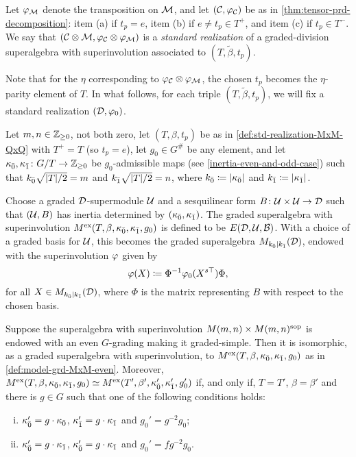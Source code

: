\begin{defi}
    Let $\varphi_{\mathcal M}$ denote the transposition on $\mathcal M$, and let $(\mathcal C, \varphi_{\mathcal C})$ be as in \cref{thm:tensor-prd-decomposition}: item (a) if $t_p =e$, item (b) if $e \neq t_p \in T^+$, and item (c) if $t_p \in T^-$.
    We say that $(\mathcal C \otimes \mathcal M, \varphi_{\mathcal C} \otimes \varphi_{\mathcal M})$ is a \emph{standard realization} of a graded-division superalgebra with superinvolution associated to $(T, \tilde\beta, t_p)$. 
\end{defi}

Note that for the $\eta$ corresponding to $ \varphi_{\mathcal C} \otimes \varphi_{\mathcal M}$, the chosen $t_p$ becomes the $\eta$-parity element of $T$. 
In what follows, for each triple $(T, \tilde\beta, t_p)$, we will fix a standard realization $(\mathcal{D}, \varphi_0)$. 


\begin{defi}\label{def:model-grd-MxM-even}
    Let $m, n\in \mathbb{Z}_{\geq 0}$, not both zero, 
    let $(T, \beta, t_p)$ be as in \cref{def:std-realization-MxM-QxQ} with $T^+ = T$ (so $t_p = e$), 
    let $g_0 \in G^\#$ be any element, and
    let $\kappa_{\bar{0}}, \kappa_{\bar{1}} \colon G/T \to \mathbb{Z}_{\geq 0}$ be  $g_0$-admissible maps (see \cref{inertia-even-and-odd-case}) such that $k_{\bar{0}} \sqrt{|T|/2} = m$ and $k_{\bar{1}} \sqrt{|T|/2} = n$, where $k_{\bar{0}} \coloneqq |\kappa_{\bar{0}}|$ and $k_{\bar{1}} \coloneqq |\kappa_{\bar{1}}|$. 
    
    Choose a graded $\mathcal{D}$-supermodule $\mathcal U$ and a sesquilinear form $B\colon {\mathcal U\times \mathcal U} \to \mathcal{D}$ such that $(\mathcal U, B)$ has inertia determined by $(\kappa_{\bar{0}}, \kappa_{\bar{1}})$. 
    The graded superalgebra with superinvolution $M^{\mathrm{ex}}(T, \beta, \kappa_{\bar{0}}, \kappa_{\bar{1}}, g_0)$ is defined to be $E(\mathcal{D}, \mathcal U, \mathcal B)$. 
    With a choice of a graded basis for $\mathcal U$, this becomes
    the graded superalgebra $M_{k_{\bar{0}} | k_{\bar{1}}} (\mathcal{D})$, endowed with the superinvolution $\varphi$ given by 
    \[
        \varphi(X) \coloneqq \Phi^{-1} \varphi_0(X^{s\top}) \Phi,
    \]
    for all $X \in M_{k_{\bar{0}} | k_{\bar{1}}} (\mathcal{D})$, where $\Phi$ is the matrix representing $B$ with respect to the chosen basis. 
\end{defi}

\begin{thm}\label{thm:MxM-even}
    Suppose the superalgebra with superinvolution $M(m,n) \times M(m,n)^{\mathrm{sop}}$ is endowed with an even $G$-grading making it graded-simple. 
    Then it is isomorphic, as a graded superalgebra with superinvolution, to $M^{\mathrm{ex}}(T,\beta, \kappa_{\bar{0}}, \kappa_{\bar{1}}, g_0)$ as in \cref{def:model-grd-MxM-even}. 
    Moreover, $M^{\mathrm{ex}} (T, \beta, \kappa_{\bar{0}}, \kappa_{\bar{1}}, g_0) \simeq M^{\mathrm{ex}} (T', \beta', \kappa_{\bar{0}}', \kappa_{\bar{1}}', g_0')$ if, and only if, $T =T'$, $\beta = \beta'$ and there is $g \in G$ such that one of the following conditions holds:
    \begin{enumerate}[(i)]
        \item $\kappa_{\bar{0}}' = g\cdot\kappa_{\bar{0}}$, $\kappa_{\bar{1}}' = g\cdot\kappa_{\bar{1}}$ and $g_0' = g^{-2}g_0$;
        \item $\kappa_{\bar{0}}' = g\cdot\kappa_{\bar{1}}$, $\kappa_{\bar{0}}' = g\cdot\kappa_{\bar{1}}$ and $g_0' = fg^{-2}g_0$. 
    \end{enumerate}
\end{thm}

